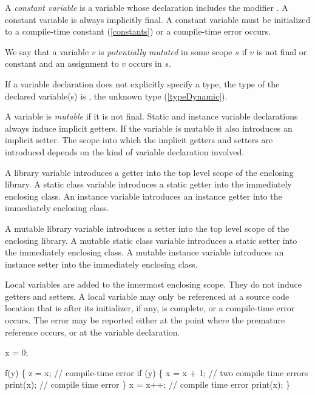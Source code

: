 \documentclass{article}
\begin{document}
\LMHash{}
A {\em constant variable} is a variable whose declaration includes the modifier \CONST{}. A constant variable is always implicitly final. A constant variable must be initialized to a compile-time constant (\ref{constants}) or a compile-time error occurs.

\LMHash{}
We say that a variable $v$ is {\em potentially mutated} in some scope $s$ if $v$ is not final or constant and an assignment to $v$ occurs in $s$.

\LMHash{}
If a variable declaration does not explicitly specify a type, the type of the declared variable(s) is  \DYNAMIC{}, the unknown type (\ref{typeDynamic}).

\LMHash{}
A variable is {\em mutable} if it is not final.
Static and instance variable declarations always induce implicit getters. If the variable is mutable it also introduces an implicit setter.
The scope into which the implicit getters and setters are introduced depends on the kind of variable declaration involved.

\LMHash{}
A library variable introduces a getter into the top level scope of the enclosing library. A static class variable introduces a static getter into the immediately enclosing class. An instance variable introduces an instance getter into the immediately enclosing class.

\LMHash{}
A mutable library variable introduces a setter into the top level scope of the enclosing library. A mutable static class variable introduces a static setter into the immediately enclosing class. A mutable instance variable introduces an instance setter into the immediately enclosing class.

\LMHash{}
Local variables are added to the innermost enclosing scope.  They do not induce getters and setters.  A local variable may only be referenced at a source code location that is after its initializer, if any, is complete, or a compile-time error occurs.  The error may be reported either at the point where the premature reference occurs, or at the variable declaration.



\begin{dartCode}
\VAR{} x = 0;

f(y) \{
  \VAR{} z = x; // compile-time error
  if (y) \{
    x = x + 1; // two compile time errors
    print(x); // compile time error
  \}
 \VAR{} x = x++; // compile time error
 print(x);
\}
\end{dartCode}
\end{document}
